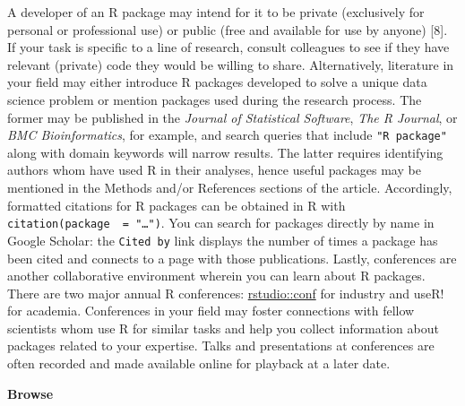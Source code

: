 \documentclass[10pt,letterpaper]{article}
\begin{document}
A developer of an R package may intend for it to be private (exclusively
for personal or professional use) or public (free and available for use
by anyone) {[}8{]}. If your task is specific to a line of research,
consult colleagues to see if they have relevant (private) code they
would be willing to share. Alternatively, literature in your field may
either introduce R packages developed to solve a unique data science
problem or mention packages used during the research process. The former
may be published in the \emph{Journal of Statistical Software},
\emph{The R Journal}, or \emph{BMC Bioinformatics}, for example, and
search queries that include \texttt{"R\ package"} along with domain
keywords will narrow results. The latter requires identifying authors
whom have used R in their analyses, hence useful packages may be
mentioned in the Methods and/or References sections of the article.
Accordingly, formatted citations for R packages can be obtained in R
with \texttt{citation(package\ \ =\ "\ldots{}")}. You can search for
packages directly by name in Google Scholar: the \texttt{Cited\ by} link
displays the number of times a package has been cited and connects to a
page with those publications. Lastly, conferences are another
collaborative environment wherein you can learn about R packages. There
are two major annual R conferences:
\href{https://rstudio.com/conference/}{rstudio::conf} for industry and
useR! for academia. Conferences in your field may foster connections
with fellow scientists whom use R for similar tasks and help you collect
information about packages related to your expertise. Talks and
presentations at conferences are often recorded and made available
online for playback at a later date.

\textbf{Browse}
\end{document}
